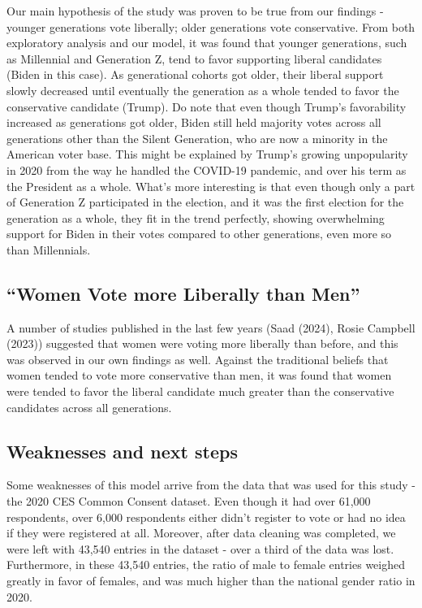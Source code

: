 \documentclass[
  letterpaper,
  DIV=11,
  numbers=noendperiod]{scrartcl}
\begin{document}
Our main hypothesis of the study was proven to be true from our findings
- younger generations vote liberally; older generations vote
conservative. From both exploratory analysis and our model, it was found
that younger generations, such as Millennial and Generation Z, tend to
favor supporting liberal candidates (Biden in this case). As
generational cohorts got older, their liberal support slowly decreased
until eventually the generation as a whole tended to favor the
conservative candidate (Trump). Do note that even though Trump's
favorability increased as generations got older, Biden still held
majority votes across all generations other than the Silent Generation,
who are now a minority in the American voter base. This might be
explained by Trump's growing unpopularity in 2020 from the way he
handled the COVID-19 pandemic, and over his term as the President as a
whole. What's more interesting is that even though only a part of
Generation Z participated in the election, and it was the first election
for the generation as a whole, they fit in the trend perfectly, showing
overwhelming support for Biden in their votes compared to other
generations, even more so than Millennials.

\hypertarget{women-vote-more-liberally-than-men}{%
\subsection{``Women Vote more Liberally than
Men''}\label{women-vote-more-liberally-than-men}}

A number of studies published in the last few years (Saad (2024), Rosie
Campbell (2023)) suggested that women were voting more liberally than
before, and this was observed in our own findings as well. Against the
traditional beliefs that women tended to vote more conservative than
men, it was found that women were tended to favor the liberal candidate
much greater than the conservative candidates across all generations.

\hypertarget{weaknesses-and-next-steps}{%
\subsection{Weaknesses and next steps}\label{weaknesses-and-next-steps}}

Some weaknesses of this model arrive from the data that was used for
this study - the 2020 CES Common Consent dataset. Even though it had
over 61,000 respondents, over 6,000 respondents either didn't register
to vote or had no idea if they were registered at all. Moreover, after
data cleaning was completed, we were left with 43,540 entries in the
dataset - over a third of the data was lost. Furthermore, in these
43,540 entries, the ratio of male to female entries weighed greatly in
favor of females, and was much higher than the national gender ratio in
2020.
\end{document}
